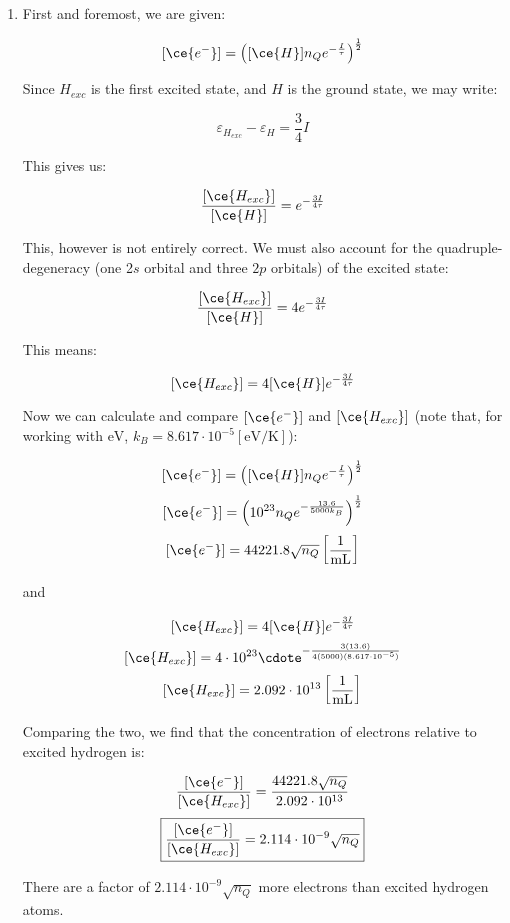\begin{enumerate}
\begin{enumerate}
      \item 

        First and foremost, we are given:

        $$[\ce{e^-}]=\left( [\ce{H}]n_Qe^{-\frac{I}{\tau}} \right)^{\frac{1}{2}}$$

        Since $H_{exc}$ is the first excited state, and $H$ is the ground state, we may write:

        $$\varepsilon_{H_{exc}}-\varepsilon_{H}=\frac{3}{4}I$$

        This gives us:

        $$\frac{[\ce{H_{exc}}]}{[\ce{H}]}=e^{-\frac{3I}{4\tau}}$$

        This, however is not entirely correct. We must also account for the quadruple-degeneracy (one 2$s$ orbital and three $2p$ orbitals) of the excited state:

        $$\frac{[\ce{H_{exc}}]}{[\ce{H}]}=4e^{-\frac{3I}{4\tau}}$$

        This means:

        $$[\ce{H_{exc}}]=4[\ce{H}]e^{-\frac{3I}{4\tau}}$$

        Now we can calculate and compare $[\ce{e^-}]$ and $[\ce{H_{exc}}]$ (note that, for working with $\si{\eV}$, $k_B=8.617\cdot10^{-5}[\si{\eV}/\si{\kelvin}]$):

        $$[\ce{e^-}]=\left( [\ce{H}]n_Qe^{-\frac{I}{\tau}} \right)^{\frac{1}{2}}$$
        $$[\ce{e^-}]=\left( 10^{23}n_Qe^{-\frac{13.6}{5000k_B}} \right)^{\frac{1}{2}}$$
        $$[\ce{e^-}]=44221.8\sqrt{n_Q}\left[ \frac{1}{\si{\milli\liter}} \right]$$

        \begin{center}
          and
        \end{center}

        $$[\ce{H_{exc}}]=4[\ce{H}]e^{-\frac{3I}{4\tau}}$$
        $$[\ce{H_{exc}}]=4\cdot10^{23}\cdote^{-\frac{3(13.6)}{4(5000)(8.617\cdot10^{-5})}}$$
        $$[\ce{H_{exc}}]=2.092\cdot10^{13}\left[ \frac{1}{\si{\milli\liter}} \right]$$

        Comparing the two, we find that the concentration of electrons relative to excited hydrogen is:

        $$\frac{[\ce{e^-}]}{[\ce{H_{exc}}]}=\frac{44221.8\sqrt{n_Q}}{2.092\cdot10^{13}}$$
        $$\boxed{\frac{[\ce{e^-}]}{[\ce{H_{exc}}]}=2.114\cdot10^{-9}\sqrt{n_Q}}$$

        There are a factor of $2.114\cdot10^{-9}\sqrt{n_Q}$ more electrons than excited hydrogen atoms.


\end{enumerate}
\end{enumerate}
